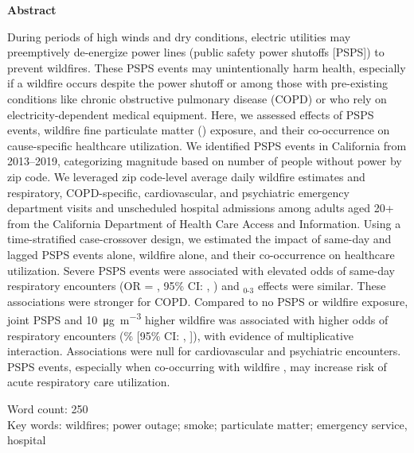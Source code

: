 \documentclass[../main.tex]{subfiles}
\begin{document}
\textbf{Abstract}

During periods of high winds and dry conditions, electric utilities may preemptively de-energize power lines (public safety power shutoffs [PSPS]) to prevent wildfires.\citep{PSEHealthyEnergy_PSPS} These PSPS events may unintentionally harm health, especially if a wildfire occurs despite the power shutoff or among those with pre-existing conditions like chronic obstructive pulmonary disease (COPD) or who rely on electricity-dependent medical equipment. Here, we assessed effects of PSPS events, wildfire fine particulate matter (\PM) exposure, and their co-occurrence on cause-specific healthcare utilization. We identified PSPS events in California from 2013--2019,\citep{cpuc_psps_reports} categorizing magnitude based on number of people without power by zip code. We leveraged zip code-level average daily wildfire \PM estimates\citep{aguilera2023novel} and respiratory, COPD-specific, cardiovascular, and psychiatric emergency department visits and unscheduled hospital admissions among adults aged 20+ from the California Department of Health Care Access and Information.\citep{hcai_datasets} Using a time-stratified case-crossover design, we estimated the impact of same-day and lagged PSPS events alone, wildfire \PM alone, and their co-occurrence on healthcare utilization. Severe PSPS events were associated with elevated odds of same-day respiratory encounters (OR = \respabsorSameDay{}, 95\% CI: \respabscilowSameDay{}, \respabscihighSameDay{}) and $_{0\text{-}3}$ effects were similar. These associations were stronger for COPD. Compared to no PSPS or wildfire exposure, joint PSPS and \SI[per-mode=symbol]{10}{\micro\gram\per\cubic\metre} higher wildfire \PM was associated with higher odds of respiratory encounters (\respcombabspercSameDay\% [95\% CI: \respcombabslowSameDay{}, \respcombabshighSameDay{}]), with evidence of multiplicative interaction. Associations were null for cardiovascular and psychiatric encounters. PSPS events, especially when co-occurring with wildfire \PM, may increase risk of acute respiratory care utilization.



\bigskip
\bigskip

Word count: 250
\\

Key words: wildfires; power outage; smoke; particulate matter; emergency service, hospital
\end{document}
